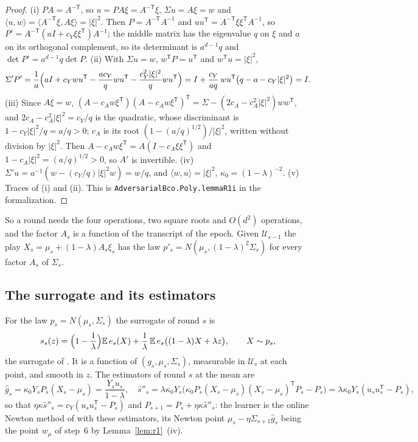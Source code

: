 \documentclass[11pt]{amsart}
\theoremstyle{definition}
\numberwithin{equation}{section}
\newcommand{\E}{\mathbb{E}}
\newcommand{\ip}[1]{\langle #1\rangle}
\begin{document}
\begin{proof}
(i) $PA=A^{-\mathsf T}$, so $u=PA\xi=A^{-\mathsf T}\xi$, $\Sigma u=A\xi=w$ and $\ip{u,w}=\ip{A^{-\mathsf T}\xi,A\xi}=|\xi|^2$. Then $P=A^{-\mathsf T}A^{-1}$ and $uu^{\mathsf T}=A^{-\mathsf T}\xi\xi^{\mathsf T}A^{-1}$, so $P'=A^{-\mathsf T}(aI+c_Y\xi\xi^{\mathsf T})A^{-1}$; the middle matrix has the eigenvalue $q$ on $\xi$ and $a$ on its orthogonal complement, so its determinant is $a^{d-1}q$ and $\det P'=a^{d-1}q\det P$. (ii) With $\Sigma u=w$, $w^{\mathsf T}P=u^{\mathsf T}$ and $w^{\mathsf T}u=|\xi|^2$,
\[
\Sigma'P'=\frac1a\Bigl(aI+c_Ywu^{\mathsf T}-\frac{ac_Y}qwu^{\mathsf T}-\frac{c_Y^2|\xi|^2}qwu^{\mathsf T}\Bigr)=I+\frac{c_Y}{aq}\,wu^{\mathsf T}\bigl(q-a-c_Y|\xi|^2\bigr)=I.
\]
(iii) Since $A\xi=w$, $(A-c_Aw\xi^{\mathsf T})(A-c_Aw\xi^{\mathsf T})^{\mathsf T}=\Sigma-(2c_A-c_A^2|\xi|^2)ww^{\mathsf T}$, and $2c_A-c_A^2|\xi|^2=c_Y/q$ is the quadratic, whose discriminant is $1-c_Y|\xi|^2/q=a/q>0$; $c_A$ is its root $(1-(a/q)^{1/2})/|\xi|^2$, written without division by $|\xi|^2$. Then $A-c_Aw\xi^{\mathsf T}=A(I-c_A\xi\xi^{\mathsf T})$ and $1-c_A|\xi|^2=(a/q)^{1/2}>0$, so $A'$ is invertible. (iv) $\Sigma'u=a^{-1}(w-(c_Y/q)|\xi|^2w)=w/q$, and $\ip{w,u}=|\xi|^2$, $\kappa_0=(1-\lambda)^{-2}$. (v) Traces of (i) and (ii).
This is \texttt{AdversarialBco.Poly.lemmaR1i} in the formalization.
\end{proof}

So a round needs the four operations, two square roots and $O(d^2)$ operations, and the factor $A_s$ is a function of the transcript of the epoch. Given $\mathcal U_{s-1}$ the play $X_s=\mu_s+(1-\lambda)A_s\xi_s$ has the law $p'_s=N(\mu_s,(1-\lambda)^2\Sigma_s)$ for every factor $A_s$ of $\Sigma_s$.

\subsection{The surrogate and its estimators}\label{app:epoch-ub}

For the law $p_s=N(\mu_s,\Sigma_s)$ the surrogate of round $s$ is
\[
s_s(z)=\Bigl(1-\frac1\lambda\Bigr)\E\,e_s(X)+\frac1\lambda\,\E\,e_s\bigl((1-\lambda)X+\lambda z\bigr),\qquad X\sim p_s,
\]
the surrogate of \cite[Chapter~11]{Lat24}. It is a function of $(g_s,\mu_s,\Sigma_s)$, measurable in $\mathcal U_s$ at each point, and smooth in $z$. The estimators of round $s$ at the mean are
\[
\hat g_s=\kappa_0Y_sP_s(X_s-\mu_s)=\frac{Y_su_s}{1-\lambda},\quad \hat s''_s=\lambda\kappa_0Y_s\bigl(\kappa_0P_s(X_s-\mu_s)(X_s-\mu_s)^{\mathsf T}P_s-P_s\bigr)=\lambda\kappa_0Y_s(u_su_s^{\mathsf T}-P_s),
\]
so that $\eta\kappa\hat s''_s=c_Y(u_su_s^{\mathsf T}-P_s)$ and $P_{s+1}=P_s+\eta\kappa\hat s''_s$: the learner is the online Newton method of \cite[Chapter~11]{Lat24} with these estimators, its Newton point $\mu_s-\eta\Sigma_{s+1}\hat g_s$ being the point $w_\mu$ of step~6 by Lemma~\ref{lem:r1}~(iv).
\end{document}
